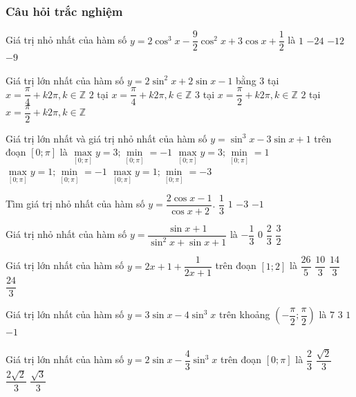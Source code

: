 \subsubsection{Câu hỏi trắc nghiệm}
\begin{ex}%
	Giá trị nhỏ nhất của hàm số $y=2\cos^3x-\dfrac{9}{2}\cos^2x+3\cos x+\dfrac{1}{2}$ là 
	\choice
	{$1$}
	{$-24$}
	{$-12$}
	{\True $-9$}
\end{ex}
\begin{ex}%
	Giá trị lớn nhất của hàm số $y=2\sin^2x+2\sin x-1$ bằng 
	\choice
	{$3$ tại $x=\dfrac{\pi}{4}+k2\pi,k\in\mathbb{Z}$}
	{$2$ tại $x=\dfrac{\pi}{4}+k2\pi,k\in\mathbb{Z}$}
	{\True $3$ tại $x=\dfrac{\pi}{2}+k2\pi,k\in\mathbb{Z}$}
	{$2$ tại $x=\dfrac{\pi}{2}+k2\pi,k\in\mathbb{Z}$}
\end{ex}
\begin{ex}%
	Giá trị lớn nhất và giá trị nhỏ nhất của hàm số $y=\sin^3x-3\sin x+1$ trên đoạn $[0;\pi]$ là 
	\choice
	{$\max\limits_{[0;\pi]} y=3;\min\limits_{[0;\pi]}=-1$}
	{$\max\limits_{[0;\pi]} y=3;\min\limits_{[0;\pi]}=1$}
	{\True $\max\limits_{[0;\pi]} y=1;\min\limits_{[0;\pi]}=-1$}
	{$\max\limits_{[0;\pi]} y=1;\min\limits_{[0;\pi]}=-3$}
\end{ex}
\begin{ex}%
	Tìm giá trị nhỏ nhất của hàm số $y=\dfrac{2\cos x-1}{\cos x+2}$. 
	\choice
	{$\dfrac{1}{3}$}
	{$1$}
	{\True $-3$}
	{$-1$}
\end{ex}
\begin{ex}%
	Giá trị nhỏ nhất của hàm số $y=\dfrac{\sin x+1}{\sin^2x+\sin x+1}$ là 
	\choice
	{$-\dfrac{1}{3}$}
	{\True $0$}
	{$\dfrac{2}{3}$}
	{$\dfrac{3}{2}$}
\end{ex}
\begin{ex}%
	Giá trị lớn nhất của hàm số $y=2x+1+\dfrac{1}{2x+1}$ trên đoạn $[1;2]$ là 
	\choice
	{\True $\dfrac{26}{5}$}
	{$\dfrac{10}{3}$}
	{$\dfrac{14}{3}$}
	{$\dfrac{24}{3}$}
\end{ex}
\begin{ex}%
	Giá trị lớn nhất của hàm số $y=3\sin x-4\sin^3x$ trên khoảng $\left(-\dfrac{\pi}{2};\dfrac{\pi}{2}\right)$ là 
	\choice
	{$7$}
	{$3$}
	{\True $1$}
	{$-1$}
\end{ex}
\begin{ex}%
	Giá trị lớn nhất của hàm số $y=2\sin x-\dfrac{4}{3}\sin^3x$ trên đoạn $[0;\pi]$ là 
	\choice
	{$\dfrac{2}{3}$}
	{$\dfrac{\sqrt{2}}{3}$}
	{\True $\dfrac{2\sqrt{2}}{3}$}
	{$\dfrac{\sqrt{3}}{3}$}
\end{ex}
